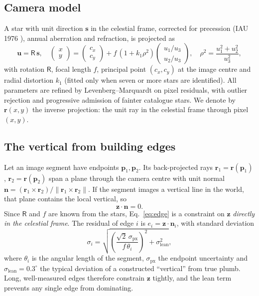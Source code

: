 \documentclass[11pt,a4paper]{article}
\newcommand{\z}{\bm{z}}
\newcommand{\n}{\bm{n}}
\newcommand{\R}{\mathsf{R}}
\begin{document}
\subsection{Camera model}

A star with unit direction $\bm{s}$ in the celestial frame, corrected for precession (IAU 1976 \citep{lieske1977}), annual aberration and refraction, is projected as
\begin{equation}
\bm{u} = \R\,\bm{s},\quad
\begin{pmatrix}x\\y\end{pmatrix} = \begin{pmatrix}c_x\\c_y\end{pmatrix} + f\,(1+k_1 \rho^2)\begin{pmatrix}u_1/u_3\\u_2/u_3\end{pmatrix},\quad \rho^2=\frac{u_1^2+u_2^2}{u_3^2},
\end{equation}
with rotation $\R$, focal length $f$, principal point $(c_x,c_y)$ at the image centre and radial distortion $k_1$ (fitted only when seven or more stars are identified). All parameters are refined by Levenberg--Marquardt on pixel residuals, with outlier rejection and progressive admission of fainter catalogue stars. We denote by $\bm{r}(x,y)$ the inverse projection: the unit ray in the celestial frame through pixel $(x,y)$.

\subsection{The vertical from building edges}
\label{sec:verticals}

Let an image segment have endpoints $\bm{p}_1,\bm{p}_2$. Its back-projected rays $\bm{r}_1=\bm{r}(\bm{p}_1)$, $\bm{r}_2=\bm{r}(\bm{p}_2)$ span a plane through the camera centre with unit normal $\n=(\bm{r}_1\times\bm{r}_2)/\|\bm{r}_1\times\bm{r}_2\|$. If the segment images a vertical line in the world, that plane contains the local vertical, so
\begin{equation}
\z\cdot\n = 0 .
\label{eq:edge}
\end{equation}
Since $\R$ and $f$ are known from the stars, Eq.~\eqref{eq:edge} is a constraint on $\z$ \emph{directly in the celestial frame}. The residual of edge $i$ is $e_i = \z\cdot\n_i$, with standard deviation
\begin{equation}
\sigma_i = \sqrt{\left(\frac{\sqrt2\,\sigma_{\mathrm{px}}}{f\,\theta_i}\right)^2 + \sigma_{\mathrm{lean}}^2},
\label{eq:edgesig}
\end{equation}
where $\theta_i$ is the angular length of the segment, $\sigma_{\mathrm{px}}$ the endpoint uncertainty and $\sigma_{\mathrm{lean}}=0.3^\circ$ the typical deviation of a constructed ``vertical'' from true plumb. Long, well-measured edges therefore constrain $\z$ tightly, and the lean term prevents any single edge from dominating.
\end{document}
